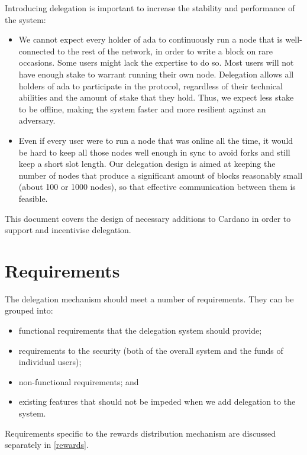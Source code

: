 \documentclass[11pt,a4paper,dvipsnames,twosided]{article}
\begin{document}
Introducing delegation is important to increase the stability and
performance of the system:

\begin{itemize}
\item
  We cannot expect every holder of ada to continuously run a node that
  is well-connected to the rest of the network, in order to write a
  block on rare occasions. Some users might lack the expertise to do so.
  Most users will not have enough stake to warrant running their own
  node. Delegation allows all holders of ada to participate in the
  protocol, regardless of their technical abilities and the amount of
  stake that they hold. Thus, we expect less stake to be offline, making
  the system faster and more resilient against an adversary.
\item
  Even if every user were to run a node that was online all the time, it
  would be hard to keep all those nodes well enough in sync to avoid
  forks and still keep a short slot length. Our delegation design is
  aimed at keeping the number of nodes that produce a significant amount
  of blocks reasonably small (about 100 or 1000 nodes), so that effective
  communication between them is feasible.
\end{itemize}

This document covers the design of necessary additions to Cardano in
order to support and incentivise delegation.

\section{Requirements}
\label{requirements}

The delegation mechanism should meet a number of requirements. They can
be grouped into:

\begin{itemize}
\item
  functional requirements that the delegation system should provide;
\item
  requirements to the security (both of the overall system and the funds
  of individual users);
\item
  non-functional requirements; and
\item
  existing features that should not be impeded when we add delegation to
  the system.
\end{itemize}

Requirements specific to the rewards distribution mechanism are
discussed separately in \cref{rewards}.
\end{document}
